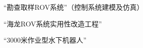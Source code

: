 
\begin{projects}{99}
    \item “勘查取样ROV系统”（控制系统建模及仿真）
    \item “海龙ROV系统实用性改造工程”
    \item “3000米作业型水下机器人”
\end{projects}
